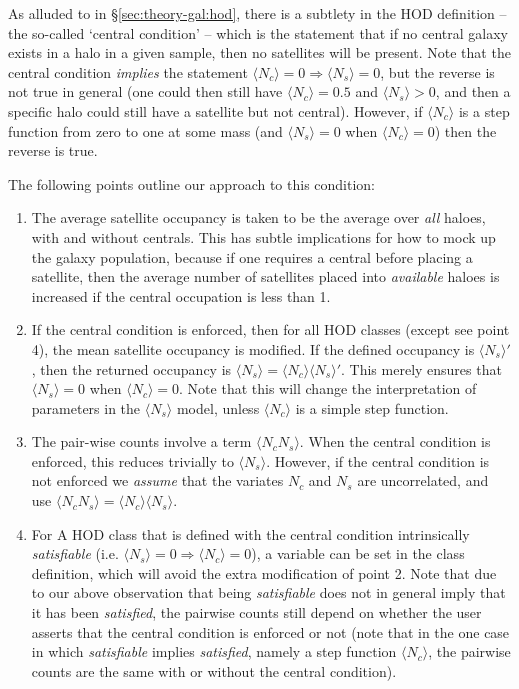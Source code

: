 \documentclass[5p,aas_macros]{elsarticle}
\newcommand{\Nc}{\langle N_c \rangle}
\newcommand{\Ns}{\langle N_s \rangle}
\begin{document}
As alluded to in \S\ref{sec:theory-gal:hod}, there is a subtlety in the HOD definition -- the so-called `central condition' -- which is the statement that if no central galaxy exists in a halo in a given sample, then no satellites will be present. Note that the central condition \textit{implies} the statement $\Nc=0 \Rightarrow \Ns=0$, but the reverse is not true in general (one could then still have $\Nc = 0.5$ and $\Ns > 0$, and then a specific halo could still have a satellite but not central). However, if $\Nc$ is a step function from zero to one at some mass (and $\Ns=0$ when $\Nc=0$) then the reverse is true.

The following points outline our approach to this condition:
\begin{enumerate}
    \item The average satellite occupancy is taken to be the average over \textit{all} haloes, with and without centrals. This has subtle implications for how to mock up the galaxy population, because if one requires a central before placing a satellite, then the average number of satellites placed into \textit{available} haloes is increased if the central occupation is less than 1.
    
    \item If the central condition is enforced, then for all HOD classes (except see point 4), the mean satellite occupancy is modified. If the defined occupancy is $\Ns'$, then the returned occupancy is $\Ns = \Nc\Ns'$. This merely ensures that $\Ns=0$ when $\Nc=0$. Note that this will change the interpretation of parameters in the $\Ns$ model, unless $\Nc$ is a simple step function.
    
    \item The pair-wise counts involve a term $\langle N_c N_s\rangle$. When the central condition is enforced, this reduces trivially to $\Ns$. However, if the central condition is not enforced we \textit{assume} that the variates $N_c$ and $N_s$ are uncorrelated, and use $\langle N_c N_s\rangle = \Nc\Ns$.
    
    \item For A HOD class that is defined with the central condition intrinsically \textit{satisfiable} (i.e. $\Ns=0 \Rightarrow \Nc=0$), a variable can be set in the class definition, which will avoid the extra modification of point 2. Note that due to our above observation that being \textit{satisfiable} does not in general imply that it has been \textit{satisfied}, the pairwise counts still depend on whether the user asserts that the central condition is enforced or not (note that in the one case in which \textit{satisfiable} implies \textit{satisfied}, namely a step function $\Nc$, the pairwise counts are the same with or without the central condition).
\end{enumerate}
\end{document}
